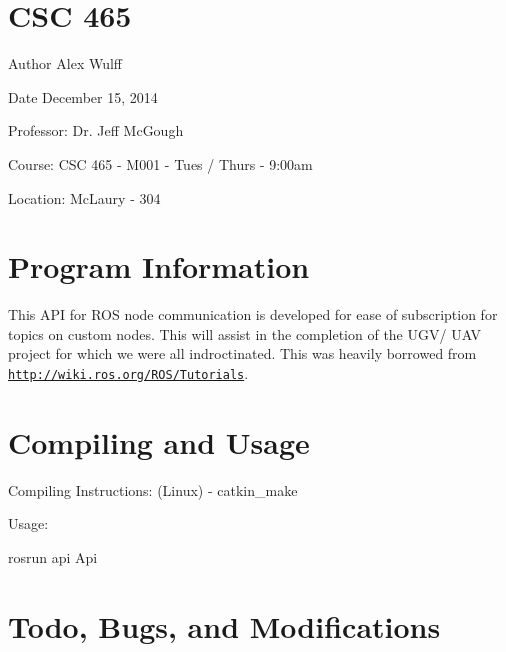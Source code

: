 \hypertarget{index_course_section}{}\section{C\-S\-C 465}\label{index_course_section}
\begin{DoxyAuthor}{Author}
Alex Wulff
\end{DoxyAuthor}
\begin{DoxyDate}{Date}
December 15, 2014
\end{DoxyDate}
\begin{DoxyParagraph}{Professor\-:}
Dr. Jeff Mc\-Gough
\end{DoxyParagraph}
\begin{DoxyParagraph}{Course\-:}
C\-S\-C 465 -\/ M001 -\/ Tues / Thurs -\/ 9\-:00am
\end{DoxyParagraph}
\begin{DoxyParagraph}{Location\-:}
Mc\-Laury -\/ 304
\end{DoxyParagraph}
\hypertarget{index_program_section}{}\section{Program Information}\label{index_program_section}
This A\-P\-I for R\-O\-S node communication is developed for ease of subscription for topics on custom nodes. This will assist in the completion of the U\-G\-V/ U\-A\-V project for which we were all indroctinated. This was heavily borrowed from \href{http://wiki.ros.org/ROS/Tutorials}{\tt http\-://wiki.\-ros.\-org/\-R\-O\-S/\-Tutorials}.\hypertarget{index_compile_section}{}\section{Compiling and Usage}\label{index_compile_section}
\begin{DoxyParagraph}{Compiling Instructions\-:}
(Linux) -\/ catkin\-\_\-make
\end{DoxyParagraph}
\begin{DoxyParagraph}{Usage\-:}
\begin{DoxyVerb}rosrun api Api
\end{DoxyVerb}

\end{DoxyParagraph}
\hypertarget{index_todo_bugs_modification_section}{}\section{Todo, Bugs, and Modifications}\label{index_todo_bugs_modification_section}

